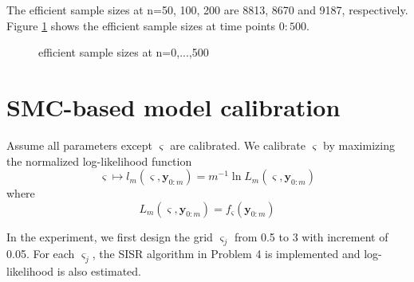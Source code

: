 \documentclass{article}
\begin{document}
The efficient sample sizes at n=50, 100, 200 are 8813, 8670 and 9187, respectively. Figure \ref{7} shows the efficient sample sizes at time points $0:500$.

\begin{figure}[h]
        \caption{\label{7} efficient sample sizes at n=0,...,500}
    \end{figure}

\section{SMC-based model calibration}
Assume all parameters except $\varsigma$ are calibrated. We calibrate $\varsigma$ by maximizing the normalized log-likelihood function
\begin{equation}
    \varsigma \mapsto l_m(\varsigma,\boldsymbol{y}_{0:m})=m^{-1}\ln{L_m(\varsigma,\boldsymbol{y}_{0:m})}
\end{equation}
where \begin{equation}
    L_m(\varsigma,\boldsymbol{y}_{0:m})=f_{\varsigma}(\boldsymbol{y}_{0:m})
\end{equation}

In the experiment, we first design the grid $\varsigma_j$ from 0.5 to 3 with increment of 0.05. For each $\varsigma_j$, the SISR algorithm in Problem 4 is implemented and log-likelihood is also estimated. 
\end{document}

